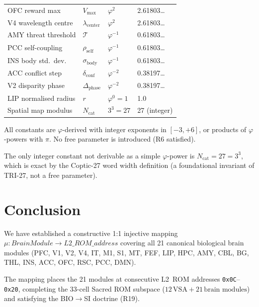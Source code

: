 \begin{table}[H]
\begin{tabular}{llll}
OFC reward max        & $V_\max$                & $\varphi^{2}$           & 2.61803\ldots \\
V4 wavelength centre  & $\lambda_\mathrm{center}$ & $\varphi^{2}$         & 2.61803\ldots \\
AMY threat threshold  & $\mathcal{T}$           & $\varphi^{-1}$          & 0.61803\ldots \\
PCC self-coupling     & $\rho_\mathrm{self}$    & $\varphi^{-1}$          & 0.61803\ldots \\
INS body std.~dev.    & $\sigma_\mathrm{body}$  & $\varphi^{-1}$          & 0.61803\ldots \\
ACC conflict step     & $\delta_\mathrm{conf}$  & $\varphi^{-2}$          & 0.38197\ldots \\
V2 disparity phase    & $\Delta_\mathrm{phase}$ & $\varphi^{-2}$          & 0.38197\ldots \\
LIP normalised radius & $r$                     & $\varphi^{0}=1$         & 1.0 \\
Spatial map modulus   & $N_\mathrm{cat}$        & $3^{3}=27$              & 27 (integer) \\
\bottomrule
\end{tabular}
\end{table}

All constants are $\varphi$-derived with integer exponents in
$[-3, +6]$, or products of $\varphi$-powers with $\pi$.
No free parameter is introduced (R6 satisfied).

The only integer constant not derivable as a simple
$\varphi$-power is $N_\mathrm{cat} = 27 = 3^3$,
which is exact by the Coptic-27 word width definition
(a foundational invariant of TRI-27, not a free parameter).

\section{Conclusion}
\label{sec:73:conclusion}

We have established a constructive 1:1 injective mapping
$\mu : \mathit{BrainModule} \to L2\_ROM\_\mathit{address}$
covering all 21 canonical biological brain modules
(PFC, V1, V2, V4, IT, M1, S1, MT, FEF, LIP, HPC, AMY, CBL,
BG, THL, INS, ACC, OFC, RSC, PCC, DMN).

The mapping places the 21 modules at consecutive L2~ROM addresses
\texttt{0x0C}--\texttt{0x20}, completing the 33-cell Sacred ROM
subspace ($12\,\text{VSA} + 21\,\text{brain modules}$) and
satisfying the BIO$\to$SI doctrine (R19).

